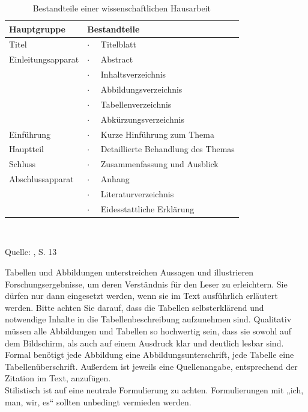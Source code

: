 \begin{table}[htbp]
\renewcommand{\arraystretch}{1.4} 
  \centering

    \begin{tabular}{|l|l|}
\hline
    \textbf{{\large Hauptgruppe}} &  \textbf{{\large Bestandteile}} \\  \hline
    Titel &  $\cdot \quad$ Titelblatt \\ \hline
    Einleitungsapparat &  $\cdot \quad$ Abstract \\
	& $\cdot \quad$ Inhaltsverzeichnis \\
          &  $\cdot \quad$ Abbildungsverzeichnis \\
          &  $\cdot \quad$ Tabellenverzeichnis \\
	&  $\cdot \quad$ Abkürzungsverzeichnis \\ \hline
    Einführung &  $\cdot \quad$ Kurze Hinführung zum Thema \\ \hline
    Hauptteil &  $\cdot \quad$ Detaillierte Behandlung des Themas  \\ \hline
    Schluss &  $\cdot \quad$ Zusammenfassung und Ausblick \\ \hline
    Abschlussapparat & $\cdot \quad$ Anhang \\
	& $\cdot \quad$ Literaturverzeichnis \\
          &  $\cdot \quad$ Eidesstattliche Erklärung \\ \hline

    \end{tabular}%
  \label{tab:tabelle1}%



$\;$\\

\caption{Bestandteile einer wissenschaftlichen Hausarbeit}

Quelle: \citet{atteslander2010}, S. 13

\end{table}
Tabellen und Abbildungen unterstreichen Aussagen und illustrieren Forschungsergebnisse, um deren Verständnis für den Leser zu erleichtern. Sie dürfen nur dann eingesetzt werden, wenn sie im Text ausführlich erläutert werden. Bitte achten Sie darauf, dass die Tabellen selbsterklärend und notwendige Inhalte in die Tabellenbeschreibung aufzunehmen sind. Qualitativ müssen alle Abbildungen und Tabellen so hochwertig sein, dass sie sowohl auf dem Bildschirm, als auch auf einem Ausdruck klar und deutlich lesbar sind. Formal benötigt jede Abbildung eine Abbildungsunterschrift, jede Tabelle eine Tabellenüberschrift. Außerdem ist jeweils eine Quellenangabe, entsprechend der Zitation im Text, anzufügen.\\
Stilistisch ist auf eine neutrale Formulierung zu achten. Formulierungen mit „ich, man, wir, es“ sollten unbedingt vermieden werden.






